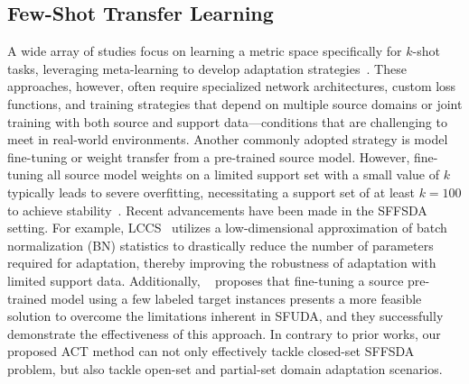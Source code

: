 \subsection{Few-Shot Transfer Learning}

A wide array of studies focus on learning a metric space specifically for $k$-shot tasks, leveraging meta-learning to develop adaptation strategies~\cite{pan2009survey}. These approaches, however, often require specialized network architectures, custom loss functions, and training strategies that depend on multiple source domains or joint training with both source and support data—conditions that are challenging to meet in real-world environments. Another commonly adopted strategy is model fine-tuning or weight transfer from a pre-trained source model. However, fine-tuning all source model weights on a limited support set with a small value of $k$ typically leads to severe overfitting, necessitating a support set of at least $k = 100$ to achieve stability~\cite{yosinski2014transferable}. Recent advancements have been made in the SFFSDA setting. For example, LCCS~\cite{zhang2022few} utilizes a low-dimensional approximation of batch normalization (BN) statistics to drastically reduce the number of parameters required for adaptation, thereby improving the robustness of adaptation with limited support data. Additionally, ~\cite{lee2023fewshot} proposes that fine-tuning a source pre-trained model using a few labeled target instances presents a more feasible solution to overcome the limitations inherent in SFUDA, and they successfully demonstrate the effectiveness of this approach. In contrary to prior works, our proposed ACT method can not only effectively tackle closed-set SFFSDA problem, but also tackle open-set and partial-set domain adaptation scenarios.